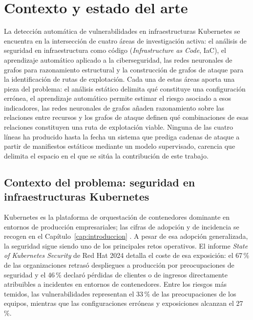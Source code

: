 \chapter{Contexto y estado del arte}
\label{cap:estado}

La detección automática de vulnerabilidades en infraestructuras Kubernetes
se encuentra en la intersección de cuatro áreas de investigación activa: el análisis
de seguridad en infraestructura como código (\textit{Infrastructure as Code}, \acs{IaC}),
el aprendizaje automático aplicado a la ciberseguridad, las redes neuronales de grafos
para razonamiento estructural y la construcción de grafos de ataque para la
identificación de rutas de explotación. Cada una de estas áreas aporta una pieza
del problema: el análisis estático delimita qué constituye una configuración errónea,
el aprendizaje automático permite estimar el riesgo asociado a esos indicadores,
las redes neuronales de grafos añaden razonamiento sobre las relaciones entre
recursos y los grafos de ataque definen qué combinaciones de esas relaciones
constituyen una ruta de explotación viable. Ninguna de las cuatro líneas ha
producido hasta la fecha un sistema que prediga cadenas de ataque a partir de
manifiestos estáticos mediante un modelo supervisado, carencia que delimita el
espacio en el que se sitúa la contribución de este trabajo.

\section{Contexto del problema: seguridad en infraestructuras Kubernetes}

Kubernetes es la plataforma de orquestación de contenedores dominante en entornos
de producción empresariales; las cifras de adopción y de incidencia se recogen en
el Capítulo~\ref{cap:introduccion} \citep{CNCF2022, RedHat2024}. A pesar de esa
adopción generalizada, la seguridad sigue siendo uno de los principales retos
operativos. El informe \textit{State of Kubernetes Security} de Red Hat 2024
\citep{RedHat2024} detalla el coste de esa exposición: el 67\,\% de las
organizaciones retrasó despliegues a producción por preocupaciones de seguridad y
el 46\,\% declaró pérdidas de clientes o de ingresos directamente atribuibles a
incidentes en entornos de contenedores. Entre los riesgos más temidos, las vulnerabilidades
representan el 33\,\% de las preocupaciones de los equipos, mientras que las
configuraciones erróneas y exposiciones alcanzan el 27\,\%.

